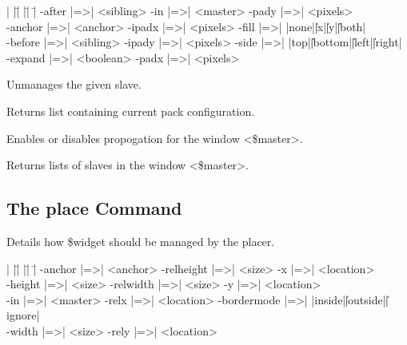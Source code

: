 \begin{tabbing}
|  |\=|               |\=|              |\= \kill
   \> -after |=>| <sibling>  \> -in |=>| <master>     \> -pady |=>| <pixels> \\ 
   \> -anchor |=>| <anchor>	\> -ipadx |=>| <pixels>  \> -fill |=>| |none|\||x|\||y|\||both| \\
   \> -before |=>| <sibling>	\>  -ipady |=>| <pixels> \> -side |=>| |top|\||bottom|\||left|\||right| \\
   \> -expand |=>| <boolean> \>  -padx |=>| <pixels> \\  
\end{tabbing}

\begin{enum}{1cm}

Unmanages the given slave.

Returns list containing current pack configuration.

Enables or disables propogation for the window <\$master>.

Returns lists of slaves in the window <\$master>.

\end{enum}

\subsection*{The place Command}
\vspace{-4pt}
\begin{enum}{1cm}

Details how \$widget should be managed by the placer.

\end{enum}

\begin{tabbing}
|  |\=|               |\=|              |\= \kill
 \> -anchor |=>| <anchor>    \> -relheight |=>| <size> \> -x |=>| <location> \\
 \> -height |=>| <size>	\> -relwidth |=>| <size>  \> -y |=>| <location> \\
 \> -in |=>| <master>	\> -relx |=>| <location>  \> -bordermode |=>| |inside|\||outside|\||ignore| \\
 \> -width |=>| <size>	\> -rely |=>| <location>  \\
\end{tabbing}

